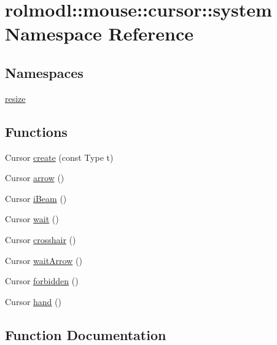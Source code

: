 \hypertarget{namespacerolmodl_1_1mouse_1_1cursor_1_1system}{}\section{rolmodl\+::mouse\+::cursor\+::system Namespace Reference}
\label{namespacerolmodl_1_1mouse_1_1cursor_1_1system}
\subsection*{Namespaces}
\begin{DoxyCompactItemize}
\item 
 \mbox{\hyperlink{namespacerolmodl_1_1mouse_1_1cursor_1_1system_1_1resize}{resize}}
\end{DoxyCompactItemize}
\subsection*{Functions}
\begin{DoxyCompactItemize}
\item 
Cursor \mbox{\hyperlink{namespacerolmodl_1_1mouse_1_1cursor_1_1system_a217d060ea221267a8735dbdf8786b187}{create}} (const Type t)
\item 
Cursor \mbox{\hyperlink{namespacerolmodl_1_1mouse_1_1cursor_1_1system_a21505c870c0ba20951aac9ccc03d1636}{arrow}} ()
\item 
Cursor \mbox{\hyperlink{namespacerolmodl_1_1mouse_1_1cursor_1_1system_a097b0cfc6602c5516959610759be81d3}{i\+Beam}} ()
\item 
Cursor \mbox{\hyperlink{namespacerolmodl_1_1mouse_1_1cursor_1_1system_a4b324eaff1b077537e3b9ff78b3c45e5}{wait}} ()
\item 
Cursor \mbox{\hyperlink{namespacerolmodl_1_1mouse_1_1cursor_1_1system_ad98f1279c810ec3d35d6f83c3a618645}{crosshair}} ()
\item 
Cursor \mbox{\hyperlink{namespacerolmodl_1_1mouse_1_1cursor_1_1system_af0c6beb57a2315683e24502b53b832d1}{wait\+Arrow}} ()
\item 
Cursor \mbox{\hyperlink{namespacerolmodl_1_1mouse_1_1cursor_1_1system_aea7c62d2e69dce05599bd645ab9b394f}{forbidden}} ()
\item 
Cursor \mbox{\hyperlink{namespacerolmodl_1_1mouse_1_1cursor_1_1system_a404421d14cfe3e32a069cefd441d86c2}{hand}} ()
\end{DoxyCompactItemize}


\subsection{Function Documentation}
\mbox{\label{namespacerolmodl_1_1mouse_1_1cursor_1_1system_a21505c870c0ba20951aac9ccc03d1636}} 
